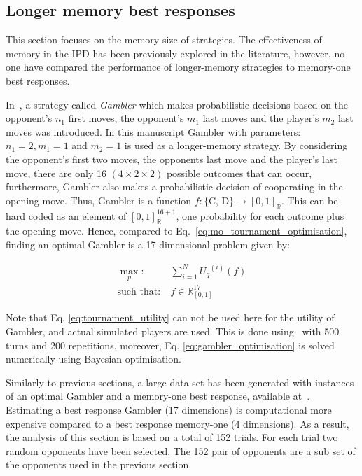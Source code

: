 \documentclass[9pt,twocolumn,twoside,lineno]{pnas-new}
\newcommand{\R}{\mathbb{R}}
\begin{document}
\subsection*{Longer memory best responses}

This section focuses on the memory size of strategies. The effectiveness of
memory in the IPD has been previously explored in the literature, however, no one
have compared the performance of longer-memory
strategies to memory-one best responses.

In~\cite{Harper2017}, a strategy called \textit{Gambler} which makes
probabilistic decisions based on the opponent's \(n_1\) first moves, the
opponent's \(m_1\) last moves and the player's \(m_2\) last moves was
introduced. In this manuscript Gambler with parameters: $n_1 = 2, m_1 = 1$ and $m_2 = 1$ is used
as a longer-memory strategy.
By considering the opponent's first two moves, the opponents last move and the
player's last move, there are only 16 $(4 \times 2 \times 2)$ possible outcomes
that can occur, furthermore, Gambler also makes a probabilistic decision of
cooperating in the opening move. Thus, Gambler is a function \(f: \{\text{C,
D}\} \rightarrow [0, 1]_{\R}\). This can be hard coded as an element
of \([0, 1]_{\R} ^ {16 + 1}\), one probability for each outcome plus the opening
move. Hence, compared to Eq.~\ref{eq:mo_tournament_optimisation}, finding an
optimal Gambler is a 17 dimensional problem given by:

\begin{equation}\label{eq:gambler_optimisation}
    \begin{aligned}
    \max_p: & \ \sum_{i=1} ^ {N} {U_q}^{(i)} (f)
    \\
    \text{such that}: & \ f \in \R_{[0, 1]}^{17}
    \end{aligned}
\end{equation}

Note that Eq. \ref{eq:tournament_utility} can not be used here for the utility
of Gambler, and actual simulated players are used. This is done using~\cite{axelrodproject}
with 500 turns and 200 repetitions, moreover, Eq. \ref{eq:gambler_optimisation}
is solved numerically using Bayesian optimisation.

Similarly to previous sections, a large data set has been generated with
instances of an optimal Gambler and a memory-one best response, available
at~\cite{glynatsi2019}. Estimating a best response Gambler (17 dimensions) is
computational more expensive compared to a best response memory-one (4
dimensions). As a result, the analysis of this section is based on a total of
152 trials. For each trial two random opponents have been selected. The 152 pair
of opponents are a sub set of the opponents used in the previous section.
\end{document}
